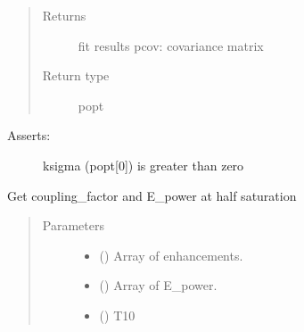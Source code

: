 \documentclass[letterpaper,10pt,english]{sphinxmanual}
\begin{document}
\begin{fulllineitems}
\begin{fulllineitems}
\begin{quote}
\begin{description}
\begin{itemize}
\end{itemize}

\item[{Returns}] \leavevmode
fit results
pcov: covariance matrix

\item[{Return type}] \leavevmode
popt

\end{description}\end{quote}
\begin{description}
\item[{Asserts:}] \leavevmode
ksigma (popt{[}0{]}) is greater than zero

\end{description}

\end{fulllineitems}


\begin{fulllineitems}
\label{\detokenize{dnpHydration:dnpLab.dnpHydration.HydrationCalculator.get_uncorrected_xi}}
Get coupling\_factor and E\_power at half saturation
\begin{quote}\begin{description}
\item[{Parameters}] \leavevmode\begin{itemize}
\item {} 
 () \sphinxhyphen{}\sphinxhyphen{} Array of enhancements.

\item {} 
 () \sphinxhyphen{}\sphinxhyphen{} Array of E\_power.

\item {} 
 () \sphinxhyphen{}\sphinxhyphen{} T10


\end{itemize}
\end{description}
\end{quote}
\end{fulllineitems}
\end{fulllineitems}
\end{document}
